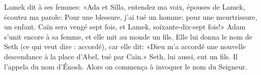 Lamek dit à ses femmes: «Ada et Silla, entendez ma voix,
	épouses de Lamek, écoutez ma parole:
	Pour une blessure, j’ai tué un homme;
		pour une meurtrissure, un enfant.
Caïn sera vengé sept fois, et Lamek, soixante-dix-sept fois!»
Adam s’unit encore à sa femme, et elle mit au monde un fils.
Elle lui donna le nom de Seth (ce qui veut dire : accordé),
	car elle dit: «Dieu m’a accordé une nouvelle descendance
	à la place d’Abel, tué par Caïn.»
Seth, lui aussi, eut un fils. Il l’appela du nom d’Énosh.
	Alors on commença à invoquer le nom du Seigneur.
